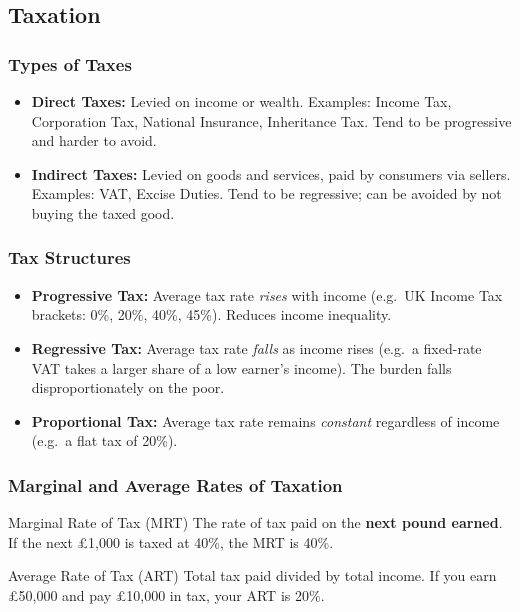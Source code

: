 \documentclass[11pt, a4paper, twoside]{book}
\begin{document}
\subsection{Taxation}

\subsubsection{Types of Taxes}

\begin{itemize}
  \item \textbf{Direct Taxes:} Levied on income or wealth. Examples: Income Tax, Corporation Tax, National Insurance, Inheritance Tax. Tend to be progressive and harder to avoid.
  \item \textbf{Indirect Taxes:} Levied on goods and services, paid by consumers via sellers. Examples: VAT, Excise Duties. Tend to be regressive; can be avoided by not buying the taxed good.
\end{itemize}

\subsubsection{Tax Structures}

\begin{itemize}
  \item \textbf{Progressive Tax:} Average tax rate \emph{rises} with income (e.g.\ UK Income Tax brackets: 0\%, 20\%, 40\%, 45\%). Reduces income inequality.
  \item \textbf{Regressive Tax:} Average tax rate \emph{falls} as income rises (e.g.\ a fixed-rate VAT takes a larger share of a low earner's income). The burden falls disproportionately on the poor.
  \item \textbf{Proportional Tax:} Average tax rate remains \emph{constant} regardless of income (e.g.\ a flat tax of 20\%).
\end{itemize}

\subsubsection{Marginal and Average Rates of Taxation}

\begin{keyterm}{Marginal Rate of Tax (MRT)}
The rate of tax paid on the \textbf{next pound earned}. If the next \pounds1{,}000 is taxed at 40\%, the MRT is 40\%.
\end{keyterm}

\begin{keyterm}{Average Rate of Tax (ART)}
Total tax paid divided by total income. If you earn \pounds50{,}000 and pay \pounds10{,}000 in tax, your ART is 20\%.
\end{keyterm}
\end{document}
